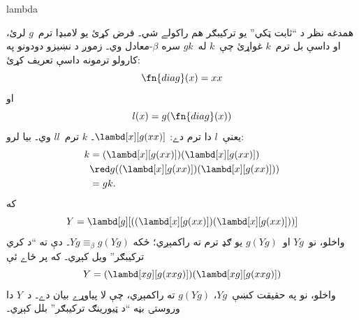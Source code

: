 \documentclass[../../../include/open-logic-section]{subfiles}
\begin{document}
\begin{tagblock}{lambda}
\begin{digress}
همدغه نظر د ``ثابت ټکي'' يو ترکيبګر هم راکولے شي۔ فرض کړئ يو لامبډا
ترم~$g$ لرئ، او داسې بل ترم~$k$ غواړئ چې~$k$ له~$gk$ سره
$\beta$-معادل وي۔ زموږ د نښيزو دودونو په کارولو ترمونه داسې تعريف
کړئ:
\[
\fn{diag}(x) = xx
\]
او
\[
l(x) = g(\fn{diag}(x))
\]
يعنې~$l$ دا ترم دے: $\lambd[x][g(xx)]$۔ $k$ ترم~$ll$ وي۔ بيا لرو:
\begin{align*}
k & = (\lambd[x][g(xx)])(\lambd[x][g(xx)]) \\
& \red  g((\lambd[x][g(xx)])(\lambd[x][g(xx)])) \\
& = gk.
\end{align*}
که
\[
Y = \lambd[g][((\lambd[x][g(xx)])(\lambd[x][g(xx)]))]
\]
واخلو، نو~$Yg$ او~$g(Yg)$ يو ګډ ترم ته راکمېږي؛ ځکه
$Yg \equiv_\beta g(Yg)$۔ دې ته ``د کري ترکيبګر'' ويل کېږي۔ که پر
ځاے ئې
\[
Y = (\lambd[xg][g(xxg)])(\lambd[xg][g(xxg)])
\]
واخلو، نو په حقيقت کښې~$Yg$، $g(Yg)$ ته راکمېږي، چې لا پياوړے بيان
دے۔ د~$Y$ دا وروستۍ بڼه ``د ټيورينګ ترکيبګر'' بلل کېږي۔
\end{digress}
\end{tagblock}
\end{document}

